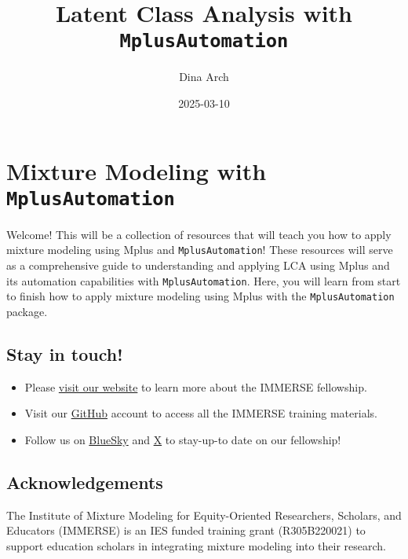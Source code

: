 \documentclass[
]{book}
\title{Latent Class Analysis with \texttt{MplusAutomation}}
\author{Dina Arch}
\date{2025-03-10}
\begin{document}
\maketitle

{
\setcounter{tocdepth}{1}
\tableofcontents
}
\chapter*{\texorpdfstring{Mixture Modeling with \texttt{MplusAutomation}}{Mixture Modeling with MplusAutomation}}\label{mixture-modeling-with-mplusautomation}

Welcome! This will be a collection of resources that will teach you how to apply mixture modeling using Mplus\citep{muthen2017} and \texttt{MplusAutomation}\citep{hallquist2018}! These resources will serve as a comprehensive guide to understanding and applying LCA using Mplus and its automation capabilities with \texttt{MplusAutomation}. Here, you will learn from start to finish how to apply mixture modeling using Mplus with the \texttt{MplusAutomation} package.

\section*{Stay in touch!}\label{stay-in-touch}

\begin{itemize}
\item
  Please \href{https://immerse.education.ucsb.edu/}{visit our website} to learn more about the IMMERSE fellowship.
\item
  Visit our \href{https://github.com/immerse-ucsb}{GitHub} account to access all the IMMERSE training materials.
\item
  Follow us on \href{https://bsky.app/profile/immerse-ucsb.bsky.social}{BlueSky} and \href{https://twitter.com/IMMERSE_UCSB}{X} to stay-up-to date on our fellowship!
\end{itemize}

\section*{Acknowledgements}\label{acknowledgements}

The Institute of Mixture Modeling for Equity-Oriented Researchers, Scholars, and Educators (IMMERSE) is an IES funded training grant (R305B220021) to support education scholars in integrating mixture modeling into their research.
\end{document}
